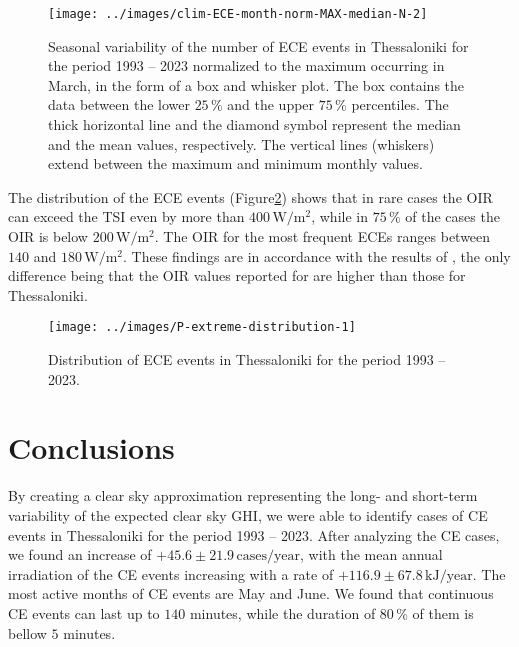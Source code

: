 \documentclass[preprint, 5p,
authoryear]{elsarticle} %
\begin{document}
\begin{figure}

{\centering \texttt{[image: ../images/clim-ECE-month-norm-MAX-median-N-2]} 

}

\caption{Seasonal variability of the number of ECE events in Thessaloniki for the period 1993 -- 2023 normalized to the maximum occurring in March, in the form of a box and whisker plot. The box contains the data between the lower $25\,\%$ and the upper $75\,\%$ percentiles. The thick horizontal line and the diamond symbol represent the median and the mean values, respectively. The vertical lines (whiskers) extend between the maximum and minimum monthly values.}\label{fig:relative-month-occurancies-ECE}
\end{figure}

The distribution of the ECE events
(Figure\nobreakspace{}\ref{fig:P-extreme-distribution}) shows that in
rare cases the OIR can exceed the TSI even by more than
\(400\,\text{W}/\text{m}^2\), while in \(75\,\%\) of the cases the OIR
is below \(200\,\text{W}/\text{m}^2\). The OIR for the most frequent
ECEs ranges between \(140\) and \(180\,\text{W}/\text{m}^2\). These
findings are in accordance with the results of \citet{Vamvakas2020}, the
only difference being that the OIR values reported for are higher than
those for Thessaloniki.

\begin{figure}

{\centering \texttt{[image: ../images/P-extreme-distribution-1]} 

}

\caption{Distribution of ECE events in Thessaloniki for the period 1993 -- 2023.}\label{fig:P-extreme-distribution}
\end{figure}

\hypertarget{conclusions}{%
\section{Conclusions}\label{conclusions}}

By creating a clear sky approximation representing the long- and
short-term variability of the expected clear sky GHI, we were able to
identify cases of CE events in Thessaloniki for the period 1993 -- 2023.
After analyzing the CE cases, we found an increase of
\(+45.6\pm 21.9\,\text{cases}/\text{year}\), with the mean annual
irradiation of the CE events increasing with a rate of
\(+116.9\pm 67.8\,\text{kJ}/\text{year}\). The most active months of CE
events are May and June. We found that continuous CE events can last up
to \(140\) minutes, while the duration of \(80\,\%\) of them is bellow
\(5\) minutes.
\end{document}
